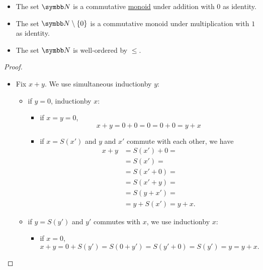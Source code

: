\begin{Proposition}\label{def:natural_numbers}
  \begin{itemize}\mbox{}
    \item The set \( \BN \) is a commutative \hyperref[def:magma]{monoid} under addition with \( 0 \) as identity.
    \item The set \( \BN \setminus \{ 0 \} \) is a commutative monoid under multiplication with \( 1 \) as identity.
    \item The set \( \BN \) is well-ordered by \( \leq \).
  \end{itemize}
\end{Proposition}
\begin{proof}
  \begin{itemize}\mbox{}
    \item Fix \( x + y \). We use simultaneous induction\IND by \( y \):
    \begin{itemize}
      \item if \( y = 0 \), induction\IND by \( x \):
      \begin{itemize}
        \item if \( x = y = 0 \),
        \begin{equation*}
          x + y = 0 + 0 = 0 = 0 + 0 = y + x
        \end{equation*}

        \item if \( x = S(x') \) and \( y \) and \( x' \) commute with each other, we have
        \begin{align*}
          x + y
          &=
          S(x') + 0
          = \\ &=
          S(x')
          = \\ &=
          S(x' + 0)
          = \\ &=
          S(x' + y)
          = \\ &=
          S(y + x')
          = \\ &=
          y + S(x')
          =
          y + x.
        \end{align*}
      \end{itemize}

      \item if \( y = S(y') \) and \( y' \) commutes with \( x \), we use induction\IND by \( x \):
      \begin{itemize}
        \item if \( x = 0 \),
        \begin{equation*}
          x + y = 0 + S(y') = S(0 + y') = S(y' + 0) = S(y') = y = y + x.
        \end{equation*}


\end{itemize}
\end{itemize}
\end{itemize}
\end{proof}
